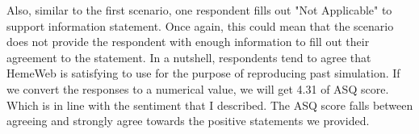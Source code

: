 Also, similar to the first scenario, one respondent fills out "Not Applicable" to support information statement. Once again, this could mean that the scenario does not provide the respondent with enough information to fill out their agreement to the statement. In a nutshell, respondents tend to agree that HemeWeb is satisfying to use for the purpose of reproducing past simulation. If we convert the responses to a numerical value, we will get 4.31 of ASQ score. Which is in line with the sentiment that I described. The ASQ score falls between agreeing and strongly agree towards the positive statements we provided.


\vspace{0.5cm}

\noindent%
\begin{minipage}{\linewidth}%
 \label{fig:survey-s2-cli}%
\end{minipage}

\vspace{0.5cm}

\noindent%
\begin{minipage}{\linewidth}%
 \label{fig:survey-s2-cli-barrier}%
\end{minipage}


